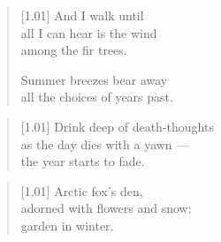   \begin{verse}[1.01\textwidth]
    And I walk until\\
    all I can hear is the wind\\
    among the fir trees.

    \vin Summer breezes bear away\\
    \vin all the choices of years past.
  \end{verse}

  \begin{verse}[1.01\textwidth]
      Drink deep of death-thoughts\\
      as the day dies with a yawn ---\\
      the year starts to fade.
  \end{verse}

  \vfill

  \newpage

  \null
  \vfill

  \begin{verse}[1.01\textwidth]
      Arctic fox's den,\\
      adorned with flowers and snow:\\
      garden in winter.
  \end{verse}

  \vfill
